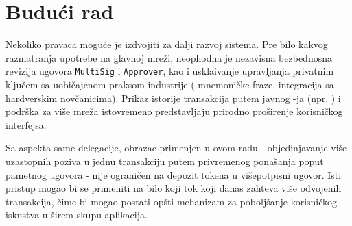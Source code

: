 \section{Budu\' ci rad}

Nekoliko pravaca mogu\' ce je izdvojiti za dalji razvoj sistema. Pre bilo kakvog razmatranja upotrebe na glavnoj mre\v zi, neophodna je nezavisna bezbednosna revizija ugovora \texttt{MultiSig} i \texttt{Approver}, kao i uskla\dj ivanje upravljanja privatnim klju\v cem sa uobi\v cajenom praksom industrije ( mnemoni\v cke fraze, integracija sa hardverskim nov\v canicima). Prikaz istorije transakcija putem javnog -ja (npr. ) i podr\v ska za vi\v se  mre\v za istovremeno predstavljaju prirodno pro\v sirenje korisni\v ckog interfejsa.

Sa aspekta same  delegacije, obrazac primenjen u ovom radu - objedinjavanje vi\v se uzastopnih poziva u jednu transakciju putem privremenog pona\v sanja poput pametnog ugovora - nije ograni\v cen na depozit  tokena u vi\v sepotpisni ugovor. Isti pristup mogao bi se primeniti na bilo koji tok koji danas zahteva vi\v se odvojenih transakcija, \v cime bi  mogao postati op\v sti mehanizam za pobolj\v sanje korisni\v ckog iskustva u \v sirem skupu  aplikacija.
